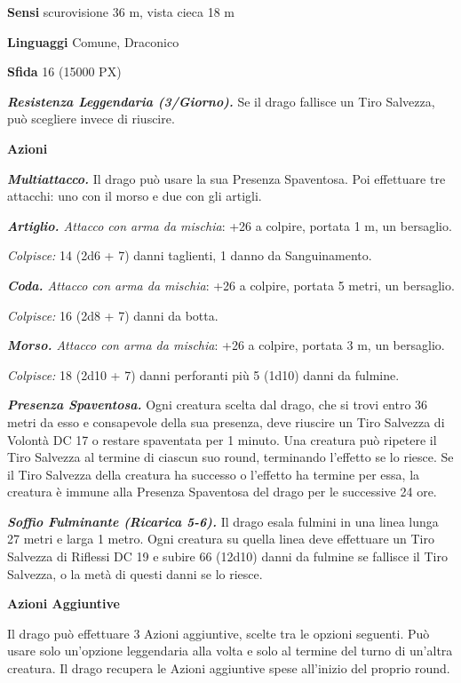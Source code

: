 \begin{multicols}{2}
	\textbf{Sensi} scurovisione 36 m, vista cieca 18 m

	\textbf{Linguaggi} Comune, Draconico

	\textbf{Sfida} 16 (15000 PX)

	\textit{\textbf{Resistenza Leggendaria (3/Giorno).}} Se il drago fallisce un Tiro Salvezza, può scegliere invece di riuscire.

	\textbf{Azioni}

	\textit{\textbf{Multiattacco.}} Il drago può usare la sua Presenza Spaventosa. Poi effettuare tre attacchi: uno con il morso e due con gli artigli.

	\textit{\textbf{Artiglio.} Attacco con arma da mischia}: +26 a colpire, portata 1 m, un bersaglio.

	\textit{Colpisce:} 14 (2d6 + 7) danni taglienti, 1 danno da Sanguinamento.

	\textit{\textbf{Coda.} Attacco con arma da mischia}: +26 a colpire, portata 5 metri, un bersaglio.

	\textit{Colpisce:} 16 (2d8 + 7) danni da botta.

	\textit{\textbf{Morso.} Attacco con arma da mischia}: +26 a colpire, portata 3 m, un bersaglio.

	\textit{Colpisce:} 18 (2d10 + 7) danni perforanti più 5 (1d10) danni da fulmine.

	\textit{\textbf{Presenza Spaventosa.}} Ogni creatura scelta dal drago, che si trovi entro 36 metri da esso e consapevole della sua presenza, deve riuscire un Tiro Salvezza di Volontà DC 17 o restare spaventata per 1 minuto. Una creatura può ripetere il Tiro Salvezza al termine di ciascun suo round, terminando l'effetto se lo riesce. Se il Tiro Salvezza della creatura ha successo o l'effetto ha termine per essa, la creatura è immune alla Presenza Spaventosa del drago per le successive 24 ore.

	\textit{\textbf{Soffio Fulminante (Ricarica 5-6).}} Il drago esala fulmini in una linea lunga 27 metri e larga 1 metro. Ogni creatura su quella linea deve effettuare un Tiro Salvezza di Riflessi DC 19 e subire 66 (12d10) danni da fulmine se fallisce il Tiro Salvezza, o la metà di questi danni se lo riesce.

	\textbf{Azioni Aggiuntive}

	Il drago può effettuare 3 Azioni aggiuntive, scelte tra le opzioni seguenti. Può usare solo un'opzione leggendaria alla volta e solo al termine del turno di un'altra creatura. Il drago recupera le Azioni aggiuntive spese all'inizio del proprio round.


\end{multicols}
